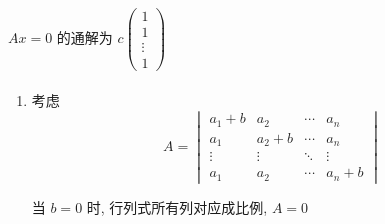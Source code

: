         \( Ax = 0 \) 的通解为 \( c \begin{pmatrix}
             1      \\
             1      \\
             \vdots \\
             1
         \end{pmatrix} \)


     \paragraph{} %
         \begin{enumerate}
             \item %
                   考虑
                   \[ A = \begin{vmatrix}
                           a_{1}+b & a_{2}   & \cdots & a_{n}   \\
                           a_{1}   & a_{2}+b & \cdots & a_{n}   \\
                           \vdots  & \vdots  & \ddots & \vdots  \\
                           a_{1}   & a_{2}   & \cdots & a_{n}+b
                       \end{vmatrix} \]

                   当 $b=0$ 时, 行列式所有列对应成比例, $A=0$


\end{enumerate}
